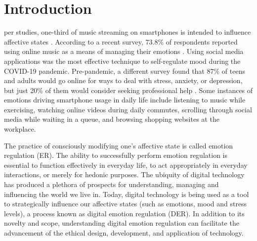 \documentclass[lettersize,journal]{IEEEtran}
\begin{document}
\section{Introduction}
 per studies, one-third of music streaming on smartphones is intended to influence affective states \cite{wadley2019use}. According to a recent survey, 73.8\% of respondents reported using online music as a means of managing their emotions \cite{martin2021music}. Using social media applications was the most effective technique to self-regulate mood during the COVID-19 pandemic. Pre-pandemic, a different survey found that 87\% of teens and adults would go online for ways to deal with stress, anxiety, or depression, but just 20\% of them would consider seeking professional help \cite{rideout2018digital}. Some instances of emotions driving smartphone usage in daily life include listening to music while exercising, watching online videos during daily commutes, scrolling through social media while waiting in a queue, and browsing shopping websites at the workplace.


The practice of consciously modifying one's affective state is called emotion regulation (ER). The ability to successfully perform emotion regulation is essential to function effectively in everyday life, to act appropriately in everyday interactions, or merely for hedonic purposes. The ubiquity of digital technology has produced a plethora of prospects for understanding, managing and influencing the world we live in. Today, digital technology is being used as a tool to strategically influence our affective states (such as emotions, mood and stress levels), a process known as digital emotion regulation (DER). In addition to its novelty and scope, understanding digital emotion regulation can facilitate the advancement of the ethical design, development, and application of technology.
\end{document}
